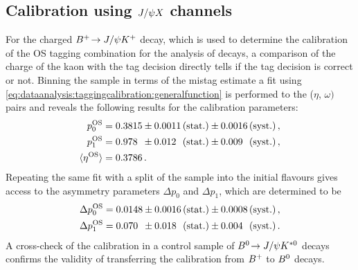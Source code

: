 
\subsection{Calibration using \texorpdfstring{$J/\psi X$}{JpsiX} channels}
\label{sec:dataanalysis:taggingcalibration:jpsixcalibration}

For the charged ${{B}^+}\!\rightarrow J/\psi{\ensuremath{{K}^+}}$ decay, which is used to determine the calibration
of the OS tagging combination for the analysis of \BdToJPsiKS decays, a
comparison of the charge of the kaon with the tag decision directly tells if
the tag decision is correct or not. Binning the sample in terms of the mistag
estimate a \chisq fit using
\cref{eq:dataanalysis:taggingcalibration:generalfunction} is performed to the
($\eta$, $\omega)$ pairs and reveals the following results for the calibration
parameters:
\begin{equation}
\begin{aligned}
  p_0^{\text{OS}} &= 0.3815 \pm 0.0011 \text{\,(stat.)}
                            \pm 0.0016 \text{\,(syst.)} \, ,\\
  p_1^{\text{OS}} &= 0.978\phantom{0} \pm 0.012\phantom{0} \text{\,(stat.)}
                                      \pm 0.009\phantom{0} \text{\,(syst.)} \, ,\\
  \langle\eta^{\text{OS}}\rangle &= 0.3786 \, .
\end{aligned}
\label{eq:dataanalysis:taggingcalibration:jpsixcalibration:os_calibration_pars}
\end{equation}
Repeating the same fit with a split of the sample into the initial flavours
gives access to the asymmetry parameters $\Delta p_0$ and $\Delta p_1$, which
are determined to be
\begin{equation}
\begin{split}
  \Delta p_0^{\text{OS}} &= 0.0148 \pm 0.0016 \text{\,(stat.)} \pm  0.0008 \text{\,(syst.)} \, , \\
  \Delta p_1^{\text{OS}} &= 0.070\phantom{0} \pm 0.018\phantom{0} \text{\,(stat.)} \pm 0.004\phantom{0} \text{\,(syst.)} \,.
\end{split}
\label{eq:dataanalysis:taggingcalibration:jpsixcalibration:os_calibration_asymmetries}
\end{equation}
A cross-check of the calibration in a control sample of ${{B}^0}\!\rightarrow J/\psi{\ensuremath{{K}^{*0}}}$
decays confirms the validity of transferring the calibration from ${{B}^+}$ to
${{B}^0}$ decays.

